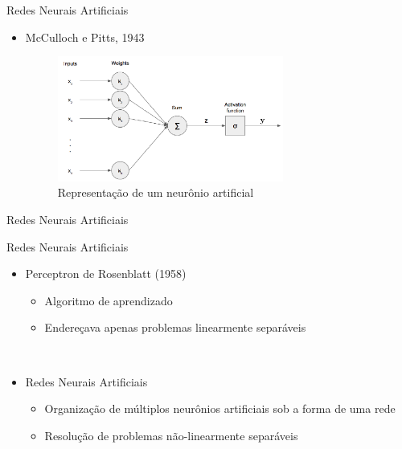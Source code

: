 \begin{frame}{Redes Neurais Artificiais}
   \ \  \\[0.1cm]
  \begin{itemize}
  \item McCulloch e Pitts, 1943
  \begin{figure}[ht]
  	\centering
  	\label{fig:neuronio}
  	\includegraphics[width=0.7\textwidth]{img/perceptron.png}
     \caption{Representação de um neurônio artificial}
  \end{figure}
\end{itemize}
\end{frame}

\begin{frame}{Redes Neurais Artificiais}
   \ \  \\[0.1cm]
   
\end{frame}

\begin{frame}{Redes Neurais Artificiais}
   \ \  \\[0.1cm]
  \begin{itemize}
  \item Perceptron de Rosenblatt (1958)
  \begin{itemize}
    \item Algoritmo de aprendizado
    \item Endereçava apenas problemas linearmente separáveis
  \end{itemize}
  \ \ \newline
  \pause
  \item Redes Neurais Artificiais
  \begin{itemize}
    \item Organização de múltiplos neurônios artificiais sob a forma de uma rede
    \item Resolução de problemas não-linearmente separáveis
  \end{itemize}
\end{itemize}
\end{frame}



